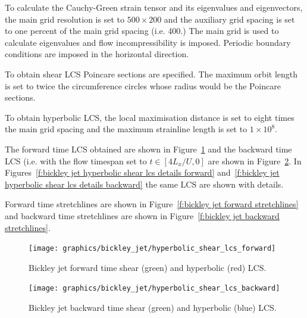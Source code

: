 \documentclass{article}
\begin{document}
To calculate the Cauchy-Green strain tensor and its eigenvalues and eigenvectors, the main grid resolution is set to $500 \times 200$ and the auxiliary grid spacing is set to one percent of the main grid spacing (i.e. 400.) The main grid is used to calculate eigenvalues and flow incompressibility is imposed. Periodic boundary conditions are imposed in the horizontal direction. 

To obtain shear LCS Poincare sections are specified. The maximum orbit length is set to twice the circumference circles whose radius would be the Poincare sections.

To obtain hyperbolic LCS, the local maximisation distance is set to eight times the main grid spacing and the maximum strainline length is set to $1 \times 10^8$.

The forward time LCS obtained are shown in Figure~\ref{f:bickley jet hyperbolic shear lcs forward} and the backward time LCS (i.e. with the flow timespan set to $t \in [4 L_x/U,0]$ are shown in Figure~\ref{f:bickley jet hyperbolic shear lcs backward}. In Figures~\ref{f:bickley jet hyperbolic shear lcs details forward} and~\ref{f:bickley jet hyperbolic shear lcs details backward} the same LCS are shown with details.

Forward time stretchlines are shown in Figure~\ref{f:bickley jet forward stretchlines} and backward time stretchlines are shown in Figure~\ref{f:bickley jet backward stretchlines}.

\begin{figure}
\begin{center}
\texttt{[image: graphics/bickley\_jet/hyperbolic\_shear\_lcs\_forward]}
\end{center}
\caption{Bickley jet forward time shear (green) and hyperbolic (red) LCS.}
\label{f:bickley jet hyperbolic shear lcs forward}
\end{figure}

\begin{figure}
\begin{center}
\texttt{[image: graphics/bickley\_jet/hyperbolic\_shear\_lcs\_backward]}
\end{center}
\caption{Bickley jet backward time shear (green) and hyperbolic (blue) LCS.}
\label{f:bickley jet hyperbolic shear lcs backward}
\end{figure}
\end{document}
